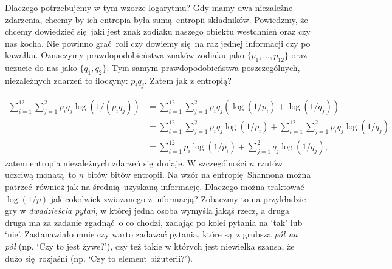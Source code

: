 \documentclass[10pt,a4paper]{article}
\begin{document}

Dlaczego potrzebujemy w tym wzorze logarytmu? 
Gdy mamy dwa niezależne zdarzenia, chcemy by ich entropia była sumą entropii składników.
Powiedzmy, że chcemy dowiedzieć się jaki jest znak zodiaku naszego obiektu westchnień oraz czy nas kocha.
Nie powinno grać roli czy dowiemy się na raz jednej informacji czy po kawałku.
Oznaczymy prawdopodobieństwa znaków zodiaku jako $\{p_1, \ldots, p_{12} \}$ oraz uczucie do nas jako $\{q_1, q_2\}$.
Tym samym prawdopodobieństwa poszczególnych, niezależnych zdarzeń to iloczyny: $p_i q_j$.
Zatem jak z entropią?
%
%

\begin{align}
    \sum_{i=1}^{12} \sum_{j=1}^2 p_i q_j \log(1/(p_i q_j))
    &= \sum_{i=1}^{12} \sum_{j=1}^2 p_i q_j \left( \log(1/p_i) + \log(1/q_j) \right)\\
    &= \sum_{i=1}^{12} \sum_{j=1}^2 p_i q_j \log(1/p_i)
    +\sum_{i=1}^{12} \sum_{j=1}^2 p_i q_j \log(1/q_j)\\
    &= \sum_{i=1}^{12} p_i \log(1/p_i)
    + \sum_{j=1}^2 q_j \log(1/q_j),
\end{align}
%
zatem entropia niezależnych zdarzeń się dodaje.
W szczególności $n$ rzutów uczciwą monatą to $n$ bitów bitów entropii.
%
%
Na wzór na entropię Shannona można patrzeć również jak na średnią uzyskaną informację.
Dlaczego można traktować $\log(1/p)$ jak cokolwiek zwiazanego z informacją?
Zobaczmy to na przykładzie gry w \emph{dwadzieścia pytań}, w której jedna osoba wymyśla jakąś rzecz, a druga druga ma za zadanie zgadnąć o co chodzi, zadając po kolei pytania na `tak' lub `nie'.
Zastanawiało mnie czy warto zadawać pytania, które są z grubsza \emph{pół na pół} (np. `Czy to jest żywe?'), czy też takie w których jest niewielka szansa, że dużo się rozjaśni (np. `Czy to element biżuterii?').
\end{document}
